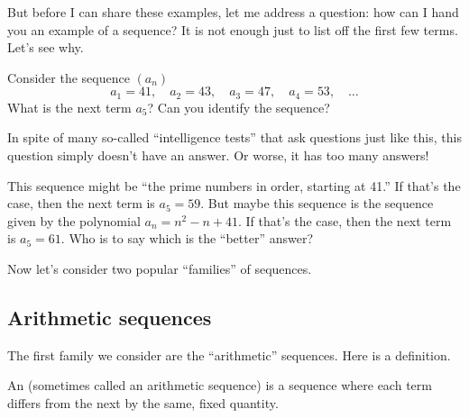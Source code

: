 But before I can share these examples, let me address a question: how
can I hand you an example of a sequence? It is not enough just to list
off the first few terms.  Let's see why.

\begin{example}
Consider the sequence $(a_n)$
$$
a_1 = 41, \quad a_2 = 43, \quad a_3 = 47, \quad a_4 = 53, \quad\ldots
$$
What is the next term $a_5$?  Can you identify the sequence?
\end{example}


\begin{solution}
  In spite of many so-called ``intelligence tests'' that ask questions
  just like this, this question simply doesn't have an answer.  Or
  worse, it has too many answers!

  This sequence might be ``the prime numbers in order, starting at
  41.''  If that's the case, then the next term is $a_5 =59$.  But
  maybe this sequence is the sequence given by the polynomial $a_n =
  n^2 - n + 41$.  If that's the case, then the next term is $a_5 =
  61$.  Who is to say which is the ``better'' answer?
\end{solution}


Now let's consider two popular ``families'' of sequences.

\subsection{Arithmetic sequences}

The first family we consider are the
``arithmetic'' sequences.  Here is a definition.

\begin{definition}
  An  (sometimes called an arithmetic
  sequence) is a sequence where each
  term differs from the next by the same, fixed quantity.
\end{definition}

